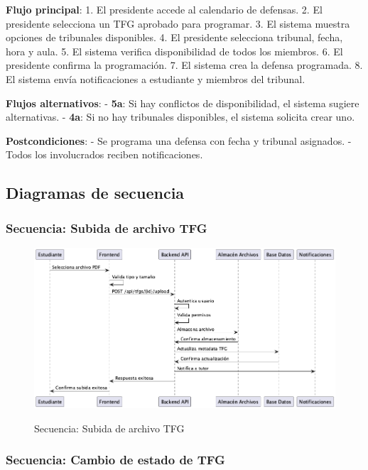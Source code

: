 \documentclass[12pt,a4paper,oneside]{report}
\providecommand{\pandocbounded}[1]{#1}
\begin{document}
\textbf{Flujo principal}: 1. El presidente accede al calendario de
defensas. 2. El presidente selecciona un TFG aprobado para programar. 3.
El sistema muestra opciones de tribunales disponibles. 4. El presidente
selecciona tribunal, fecha, hora y aula. 5. El sistema verifica
disponibilidad de todos los miembros. 6. El presidente confirma la
programación. 7. El sistema crea la defensa programada. 8. El sistema
envía notificaciones a estudiante y miembros del tribunal.

\textbf{Flujos alternativos}: - \textbf{5a}: Si hay conflictos de
disponibilidad, el sistema sugiere alternativas. - \textbf{4a}: Si no
hay tribunales disponibles, el sistema solicita crear uno.

\textbf{Postcondiciones}: - Se programa una defensa con fecha y tribunal
asignados. - Todos los involucrados reciben notificaciones.

\subsection{Diagramas de secuencia}\label{diagramas-de-secuencia}

\subsubsection{Secuencia: Subida de archivo
TFG}\label{secuencia-subida-de-archivo-tfg}

\begin{figure}
\centering
\pandocbounded{\includegraphics[keepaspectratio,alt={Secuencia: Subida de archivo TFG}]{processed/images/04_analisis_sistema_plantuml_1.png}}
\caption{Secuencia: Subida de archivo TFG}
\end{figure}

\subsubsection{Secuencia: Cambio de estado de
TFG}\label{secuencia-cambio-de-estado-de-tfg}
\end{document}
